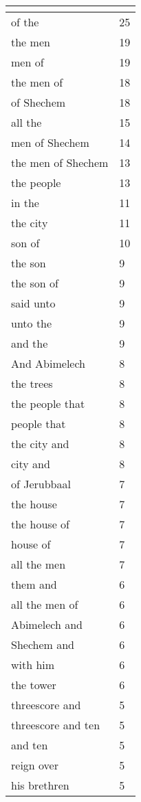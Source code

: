 \begin{center}
\begin{longtable}{|p{3.0in}|p{0.5in}|}
\hline \multicolumn{2}{c}{{ }} \\ \hline
\endfoot 
of the & 25\\ \hline 
the men & 19\\ \hline 
men of & 19\\ \hline 
the men of & 18\\ \hline 
of Shechem & 18\\ \hline 
all the & 15\\ \hline 
men of Shechem & 14\\ \hline 
the men of Shechem & 13\\ \hline 
the people & 13\\ \hline 
in the & 11\\ \hline 
the city & 11\\ \hline 
son of & 10\\ \hline 
the son & 9\\ \hline 
the son of & 9\\ \hline 
said unto & 9\\ \hline 
unto the & 9\\ \hline 
and the & 9\\ \hline 
And Abimelech & 8\\ \hline 
the trees & 8\\ \hline 
the people that & 8\\ \hline 
people that & 8\\ \hline 
the city and & 8\\ \hline 
city and & 8\\ \hline 
of Jerubbaal & 7\\ \hline 
the house & 7\\ \hline 
the house of & 7\\ \hline 
house of & 7\\ \hline 
all the men & 7\\ \hline 
them and & 6\\ \hline 
all the men of & 6\\ \hline 
Abimelech and & 6\\ \hline 
Shechem and & 6\\ \hline 
with him & 6\\ \hline 
the tower & 6\\ \hline 
threescore and & 5\\ \hline 
threescore and ten & 5\\ \hline 
and ten & 5\\ \hline 
reign over & 5\\ \hline 
his brethren & 5\\ \hline 

\end{longtable}
\end{center}
